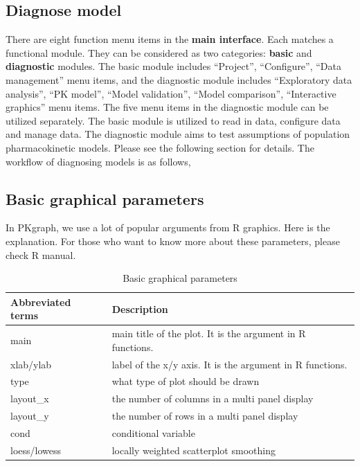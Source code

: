 \documentclass[a4paper]{article}
\begin{document}
\subsection{Diagnose model}
There are eight function menu items in the \textbf{main interface}. 
Each matches a functional module. They can be considered as two categories: 
\textbf{basic} and \textbf{diagnostic} modules. 
The basic module includes ``Project'', ``Configure'', ``Data management'' menu items, 
and the diagnostic module includes ``Exploratory data analysis'', ``PK model'', 
``Model validation'', ``Model comparison'', ``Interactive graphics'' menu items. 
The five menu items in the diagnostic module can be utilized separately.  
\newline
\newline
The basic module is utilized to read in data, configure data and manage data. The diagnostic module aims to test assumptions of population pharmacokinetic models. Please see the following section for details.
\newline
\newline
The workflow of diagnosing models is as follows, 

\subsection{Basic graphical parameters}
In PKgraph, we use a lot of popular arguments from R graphics. Here is the explanation. For those who want to know more about these parameters, please check R manual.
\begin{table}[h!tb] \centering
\begin{tabular}{l l} \hline
\textbf{ Abbreviated terms} & \textbf{Description}  \\ \hline
main & main title of the plot. It is the argument in R functions.\\
xlab/ylab & label of the x/y axis. It is the argument in R functions. \\
type & what type of plot should be drawn \\
layout\_x & the number of columns in a multi panel display \\
layout\_y & the number of rows in a multi panel display \\
cond & conditional variable \\
loess/lowess & locally weighted scatterplot smoothing \\
\hline
\end{tabular}
\caption{Basic graphical parameters}
\label{tnew_function_2}
\end{table}
\end{document}
